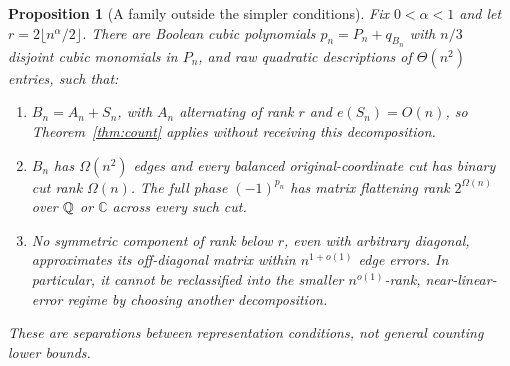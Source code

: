 \documentclass[11pt,a4paper]{article}
\newtheorem{proposition}[theorem]{Proposition}
\theoremstyle{remark}\newtheorem{remark}[theorem]{Remark}
\begin{document}
\begin{proposition}[A family outside the simpler conditions]
\label{prop:strict}
Fix $0<\alpha<1$ and let
$r=2\lfloor n^\alpha/2\rfloor$. There are Boolean cubic
polynomials $p_n=P_n+q_{B_n}$ with $n/3$ disjoint cubic
monomials in $P_n$, and raw quadratic descriptions of
$\Theta(n^2)$ entries, such that:
\begin{enumerate}
\item $B_n=A_n+S_n$, with $A_n$ alternating of rank $r$
and $e(S_n)=O(n)$, so Theorem~\ref{thm:count} applies
without receiving this decomposition.
\item $B_n$ has $\Omega(n^2)$ edges and every balanced
original-coordinate cut has binary cut rank $\Omega(n)$.
The full phase $(-1)^{p_n}$ has matrix flattening rank
$2^{\Omega(n)}$ over $\mathbb Q$ or $\mathbb C$ across every
such cut.
\item No symmetric component of rank below $r$, even
with arbitrary diagonal, approximates its off-diagonal
matrix within $n^{1+o(1)}$ edge errors. In particular,
it cannot be reclassified into the smaller
$n^{o(1)}$-rank, near-linear-error regime by choosing
another decomposition.
\end{enumerate}
These are separations between representation conditions,
not general counting lower bounds.
\end{proposition}
\end{document}
